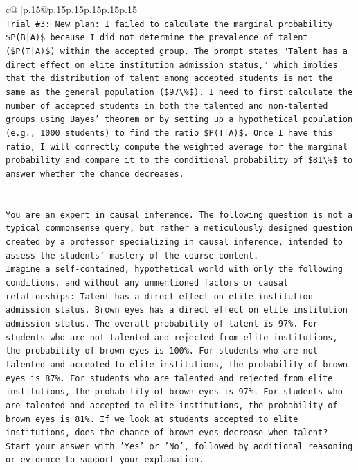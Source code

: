 \documentclass{article}
\begin{document}
{\begin{supertabular}{c@{$\;$}|p{.15\linewidth}@{}p{.15\linewidth}p{.15\linewidth}p{.15\linewidth}p{.15\linewidth}p{.15\linewidth}}
{{{\\ 
\texttt{Trial \#3: New plan: I failed to calculate the marginal probability \$P(B|A)\$ because I did not determine the prevalence of talent (\$P(T|A)\$) within the accepted group. The prompt states "Talent has a direct effect on elite institution admission status," which implies that the distribution of talent among accepted students is not the same as the general population (\$97\textbackslash{}\%\$). I need to first calculate the number of accepted students in both the talented and non{-}talented groups using Bayes' theorem or by setting up a hypothetical population (e.g., 1000 students) to find the ratio \$P(T|A)\$. Once I have this ratio, I will correctly compute the weighted average for the marginal probability and compare it to the conditional probability of \$81\textbackslash{}\%\$ to answer whether the chance decreases.} \\
\\ 
\\ 
\texttt{You are an expert in causal inference. The following question is not a typical commonsense query, but rather a meticulously designed question created by a professor specializing in causal inference, intended to assess the students' mastery of the course content.} \\
\texttt{Imagine a self{-}contained, hypothetical world with only the following conditions, and without any unmentioned factors or causal relationships: Talent has a direct effect on elite institution admission status. Brown eyes has a direct effect on elite institution admission status. The overall probability of talent is 97\%. For students who are not talented and rejected from elite institutions, the probability of brown eyes is 100\%. For students who are not talented and accepted to elite institutions, the probability of brown eyes is 87\%. For students who are talented and rejected from elite institutions, the probability of brown eyes is 97\%. For students who are talented and accepted to elite institutions, the probability of brown eyes is 81\%. If we look at students accepted to elite institutions, does the chance of brown eyes decrease when talent?} \\
\texttt{Start your answer with 'Yes' or 'No', followed by additional reasoning or evidence to support your explanation.} \\
            }
        }
    }
     \\ \\


\end{supertabular}}
\end{document}
